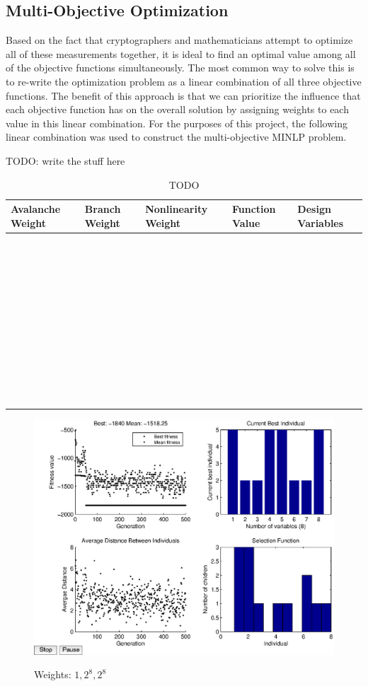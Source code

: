 \documentclass[11pt]{article}
\begin{document}
\subsection{Multi-Objective Optimization}
Based on the fact that cryptographers and mathematicians attempt to optimize all of these measurements together, it is ideal to find an optimal value among all of the objective functions simultaneously. The most common way to solve this is to re-write the optimization problem as a linear combination of all three objective functions. The benefit of this approach is that we can prioritize the influence that each objective function has on the overall solution by assigning weights to each value in this linear combination. For the purposes of this project, the following linear combination was used to construct the multi-objective MINLP problem.

TODO: write the stuff here

\begin{table}
	\centering
	\caption{TODO}
	\label{jointTable}
    \begin{tabular}{|l|l|l|l|l|}
        \hline
        Avalanche Weight & Branch Weight & Nonlinearity Weight & Function Value & Design Variables\\ \hline
        ~ & ~ & ~ \\ 
        ~ & ~ & ~ \\ 
        ~ & ~ & ~ \\ 
        ~ & ~ & ~ \\ 
        ~ & ~ & ~ \\ 
        ~ & ~ & ~ \\ 
        ~ & ~ & ~ \\ 
        ~ & ~ & ~ \\ 
        ~ & ~ & ~ \\ 
        ~ & ~ & ~ \\
        \hline
    \end{tabular}
\end{table}

\begin{figure}
	\centering
	\includegraphics[scale=0.5]{images/joint8.eps} \\
	\label{joint8}
\caption{Weights: $1, 2^8, 2^8$}
\end{figure}
\end{document}
